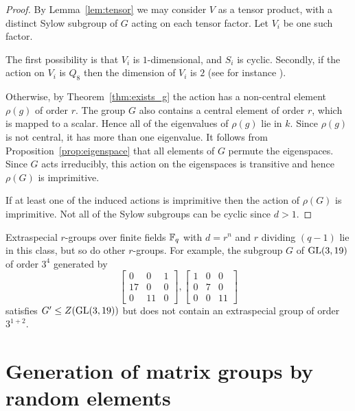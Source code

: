 \begin{proof}
By Lemma~\ref{lem:tensor} we may consider $V$ 
as a tensor product, with a distinct Sylow 
subgroup of $G$ acting on each tensor factor. 
Let $V_i$ be one such factor. 

The first possibility is that $V_i$ is $1$-dimensional, and $S_i$ is cyclic. 
Secondly, if the action on $V_i$  is $Q_8$ then the 
dimension of $V_i$ is $2$ (see for instance \cite[\S 47]{CR0}).

Otherwise, by Theorem~\ref{thm:exists_g} 
the  action has a
 non-central element  $\rho(g)$ of order $r$.
The group $G$ also contains a central element of order $r$, which is mapped to a scalar.  
 Hence all of the eigenvalues 
of $\rho(g)$ lie in $k$. Since $\rho(g)$ is 
not central, it has more than one eigenvalue.  
It follows from Proposition~\ref{prop:eigenspace} 
that all elements of $G$ permute the eigenspaces. 
Since $G$ acts irreducibly, this action on 
the eigenspaces is transitive and hence $\rho(G)$ is imprimitive.

If at least one of the induced actions is imprimitive 
then the action of $\rho(G)$ is imprimitive. Not 
all of the Sylow subgroups can be cyclic since $d > 1$.
\end{proof}

Extraspecial $r$-groups over finite fields $\mathbb{F}_q$
with $d = r^n$ and $r$ dividing $(q-1)$ lie in this class, but so do other $r$-groups. For example, the subgroup $G$ of $\GL(3, 19)$ of order $3^4$ generated by
$$\left[ \begin{array}{ccc}
0 & 0 & 1 \\
17 & 0 & 0 \\
0 & 11 & 0 \end{array}\right], 
\left[ \begin{array}{ccc}
1 & 0 & 0 \\
0 & 7 & 0 \\
0 & 0 & 11 \end{array} \right]$$
satisfies $G' \leq Z(\GL(3, 19))$ but does not contain an 
extraspecial group of order $3^{1+2}$.


\section{Generation of matrix groups by random elements} \label{sec:generation}

